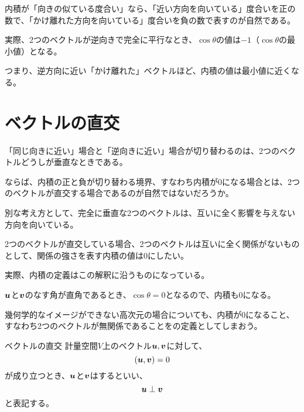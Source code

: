 \documentclass[../../../topic_linear-algebra]{subfiles}
\begin{document}
内積が「向きの似ている度合い」なら、「近い方向を向いている」度合いを正の数で、「かけ離れた方向を向いている」度合いを負の数で表すのが自然である。

\br

実際、2つのベクトルが逆向きで完全に平行なとき、$\cos \theta$の値は$-1$（$\cos\theta$の最小値）となる。

つまり、逆方向に近い「かけ離れた」ベクトルほど、内積の値は最小値に近くなる。

\sectionline
\section{ベクトルの直交}

「同じ向きに近い」場合と「逆向きに近い」場合が切り替わるのは、2つのベクトルどうしが垂直なときである。

ならば、内積の正と負が切り替わる境界、すなわち内積が$0$になる場合とは、2つのベクトルが直交する場合であるのが自然ではないだろうか。

\br

別な考え方として、完全に垂直な2つのベクトルは、互いに全く影響を与えない方向を向いている。

2つのベクトルが直交している場合、2つのベクトルは互いに全く関係がないものとして、関係の強さを表す内積の値は$0$にしたい。

\br

実際、内積の定義はこの解釈に沿うものになっている。

$\vb*{u}$と$\vb*{v}$のなす角が直角であるとき、$\cos \theta = 0$となるので、内積も0になる。

\br

幾何学的なイメージができない高次元の場合についても、内積が0になること、すなわち2つのベクトルが無関係であることをの定義としてしまおう。

\begin{definition}{ベクトルの直交}
  計量空間$V$上のベクトル$\vb*{u},\vb*{v}$に対して、
  \begin{equation*}
    (\vb*{u}, \vb*{v}) = 0
  \end{equation*}
  が成り立つとき、$\vb*{u}$と$\vb*{v}$はするといい、
  \begin{equation*}
    \vb*{u} \perp \vb*{v}
  \end{equation*}
  と表記する。
\end{definition}
\end{document}
